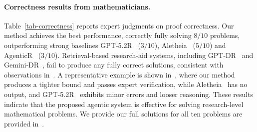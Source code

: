 \documentclass{article}
\begin{document}
\paragraph{Correctness results from mathematicians.}
Table~\ref{tab-correctness} reports expert judgments on proof correctness. Our method achieves the best performance, correctly fully solving \textbf{$8/10$} problems, outperforming strong baselines GPT-5.2R~\citep{openai_first_proof_2025} ($3/10$), Aletheia~\citep{aletheia} ($5/10$) and AgenticR~\citep{zimmer2026agenticresearcherpracticalguide} ($3/10$). Retrieval-based research-aid systems, including GPT-DR~\citep{openai_deep_research_2025} and Gemini-DR~\citep{google_gemini_deep_research_2025}, fail to produce any fully correct solutions, consistent with observations in~\citep{abouzaid2026first}. A representative example is shown in~, where our method produces a tighter bound and passes expert verification, while Aletheia~\citep{aletheia} has no output, and GPT-5.2R~\citep{openai_first_proof_2025} exhibits minor errors and looser reasoning. These results indicate that the proposed agentic system is effective for solving research-level mathematical problems. We provide our full solutions for all ten problems are provided in~.


\vspace{-7pt}
\end{document}

